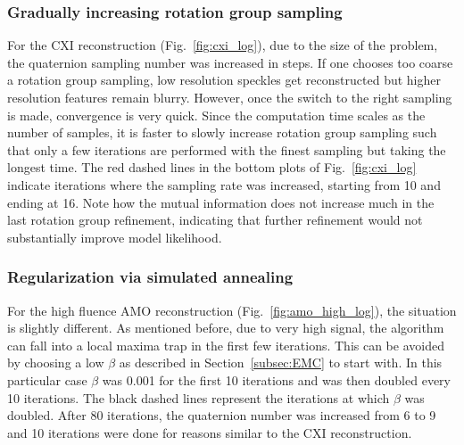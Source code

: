 \documentclass[preprint]{iucr}              %
\begin{document}
\subsubsection{Gradually increasing rotation group sampling} \label{subsec:quatRefine}
For the CXI reconstruction (Fig.~\ref{fig:cxi_log}), due to the size of the problem, the quaternion sampling number was increased in steps. If one chooses too coarse a rotation group sampling, low resolution speckles get reconstructed but higher resolution features remain blurry. However, once the switch to the right sampling is made, convergence is very quick. Since the computation time scales as the number of samples, it is faster to slowly increase rotation group sampling such that only a few iterations are performed with the finest sampling but taking the longest time. The red dashed lines in the bottom plots of Fig.~\ref{fig:cxi_log} indicate iterations where the sampling rate was increased, starting from 10 and ending at 16. Note how the mutual information does not increase much in the last rotation group refinement, indicating that further refinement would not substantially improve model likelihood.

\subsubsection{Regularization via simulated annealing} \label{subsec:regularization}
For the high fluence AMO reconstruction (Fig.~\ref{fig:amo_high_log}), the situation is slightly different. As mentioned before, due to very high signal, the algorithm can fall into a local maxima trap in the first few iterations. This can be avoided by choosing a low $\beta$ as described in Section~\ref{subsec:EMC} to start with. In this particular case $\beta$ was 0.001 for the first 10 iterations and was then doubled every 10 iterations. The black dashed lines represent the iterations at which $\beta$ was doubled. After 80 iterations, the quaternion number was increased from 6 to 9 and 10 iterations were done for reasons similar to the CXI reconstruction. 
\end{document}
